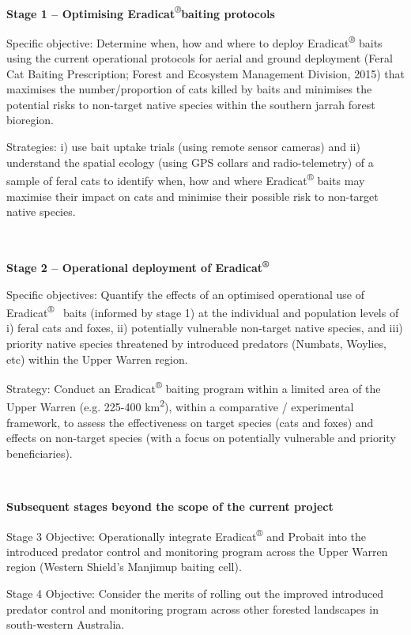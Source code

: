 \documentclass[version=last,
    paper=a4,                               %
    10pt,                                   %
    dvipsnames,
    oneside,                              %
    headings=openany,                       %
    open=any,
    BCOR=7mm,                               %
    DIV=15,     %
]{scrbook}
\begin{document}
~

\textbf{Stage 1 -- Optimising
Eradicat}\emph{\textsuperscript{®}}\textbf{baiting protocols}

Specific objective: Determine when, how and where to deploy
Eradicat\emph{\textsuperscript{®}} baits using the current operational
protocols for aerial and ground deployment (Feral Cat Baiting
Prescription; Forest and Ecosystem Management Division, 2015) that
maximises the number/proportion of cats killed by baits and minimises
the potential risks to non-target native species within the southern
jarrah forest bioregion.

Strategies: i) use bait uptake trials (using remote sensor cameras) and
ii) understand the spatial ecology (using GPS collars and
radio-telemetry) of a sample of feral cats to identify when, how and
where Eradicat\textsuperscript{®} baits may maximise their impact on
cats and minimise their possible risk to non-target native species.

~

\textbf{Stage 2 -- Operational deployment of
Eradicat\textsuperscript{®}}

Specific objectives: Quantify the effects of an optimised operational
use of Eradicat\textsuperscript{®} ~baits (informed by stage 1) at the
individual and population levels of i) feral cats and foxes, ii)
potentially vulnerable non-target native species, and iii) priority
native species threatened by introduced predators (Numbats, Woylies,
etc) within the Upper Warren region.

Strategy: Conduct an Eradicat\textsuperscript{®} baiting program within
a limited area of the Upper Warren (e.g. 225-400 km\textsuperscript{2}),
within a comparative / experimental framework, to assess the
effectiveness on target species (cats and foxes) and effects on
non-target species (with a focus on potentially vulnerable and priority
beneficiaries).

~

\textbf{Subsequent stages beyond the scope of the current project}

Stage 3 Objective: Operationally integrate Eradicat\textsuperscript{®}
and Probait into the introduced predator control and monitoring program
across the Upper Warren region (Western Shield's Manjimup baiting cell).

Stage 4 Objective: Consider the merits of rolling out the improved
introduced predator control and monitoring program across other forested
landscapes in south-western Australia.
\end{document}
